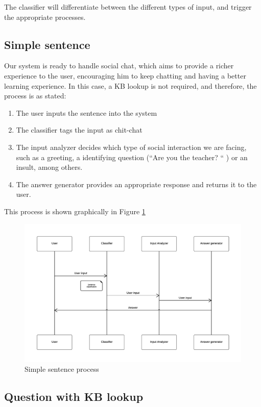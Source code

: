 
The classifier will differentiate between the different types of input, and trigger the appropriate processes.

\subsection{Simple sentence}

Our system is ready to handle social chat, which aims to provide a richer experience to the user, encouraging him to keep chatting and having a better learning experience. In this case, a \ac{KB} lookup is not required, and therefore, the process is as stated:

\begin{enumerate}
 \item The user inputs the sentence into the system
 \item The classifier tags the input as chit-chat
 \item The input analyzer decides which type of social interaction we are facing, such as a greeting, a identifying question (``Are you the teacher? `` ) or an insult, among others.
 \item The answer generator provides an appropriate response and returns it to the user.
\end{enumerate}

This process is shown graphically in Figure \ref{fig:arch2}

\begin{figure}[!htbp]
    \centering
    \includegraphics[width=\textwidth]{img/arch/SimpleSentence.png}
    \caption{Simple sentence process}
    \label{fig:arch2}
\end{figure}

\subsection{Question with \ac{KB} lookup}




% 
